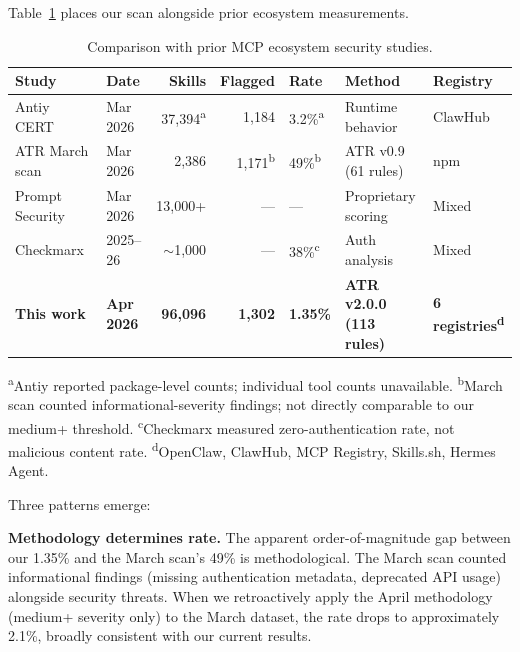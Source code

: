 \documentclass[letterpaper,twocolumn,10pt]{article}
\begin{document}
Table~\ref{tab:comparison} places our scan alongside prior ecosystem
measurements.

\begin{table}[t]
\centering
\caption{Comparison with prior MCP ecosystem security studies.}
\label{tab:comparison}
\small
\begin{tabular}{@{}llrrlll@{}}
\toprule
\textbf{Study} & \textbf{Date} & \textbf{Skills} & \textbf{Flagged} & \textbf{Rate} & \textbf{Method} & \textbf{Registry} \\
\midrule
Antiy CERT~\cite{antiy2026} & Mar 2026 & 37,394\textsuperscript{a} & 1,184 & 3.2\%\textsuperscript{a} & Runtime behavior & ClawHub \\
ATR March scan~\cite{atrscan2386} & Mar 2026 & 2,386 & 1,171\textsuperscript{b} & 49\%\textsuperscript{b} & ATR v0.9 (61 rules) & npm \\
Prompt Security~\cite{promptsec2026} & Mar 2026 & 13,000+ & --- & --- & Proprietary scoring & Mixed \\
Checkmarx~\cite{checkmarx2026} & 2025--26 & $\sim$1,000 & --- & 38\%\textsuperscript{c} & Auth analysis & Mixed \\
\textbf{This work} & \textbf{Apr 2026} & \textbf{96,096} & \textbf{1,302} & \textbf{1.35\%} & \textbf{ATR v2.0.0 (113 rules)} & \textbf{6 registries\textsuperscript{d}} \\
\bottomrule
\end{tabular}
\begin{flushleft}
\textsuperscript{a}Antiy reported package-level counts; individual tool counts unavailable.
\textsuperscript{b}March scan counted informational-severity findings; not directly comparable to our medium+ threshold.
\textsuperscript{c}Checkmarx measured zero-authentication rate, not malicious content rate.
\textsuperscript{d}OpenClaw, ClawHub, MCP Registry, Skills.sh, Hermes Agent.
\end{flushleft}
\end{table}

Three patterns emerge:

\textbf{Methodology determines rate.}  The apparent order-of-magnitude
gap between our 1.35\% and the March scan's 49\% is methodological.  The
March scan counted informational findings (missing authentication
metadata, deprecated API usage) alongside security threats.  When we
retroactively apply the April methodology (medium+ severity only) to the
March dataset, the rate drops to approximately 2.1\%, broadly consistent
with our current results.
\end{document}
